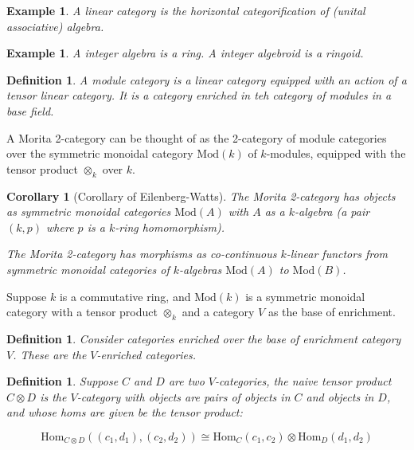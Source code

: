 \documentclass{tufte-book}
\newtheorem{definition}[theorem]{Definition}
\newtheorem{example}[theorem]{Example}
\newtheorem{corollary}[theorem]{Corollary}
\begin{document}
\begin{example}
	A linear category is the horizontal categorification of (unital associative) algebra.
\end{example}

\begin{example}
	A integer algebra is a ring. A integer algebroid is a ringoid.
\end{example}

\begin{definition}
	A module category is a linear category equipped with an action of a tensor linear category. It is a category enriched in teh category of modules in a base field.
\end{definition}

A Morita 2-category can be thought of as the 2-category of module categories over the symmetric monoidal category $\mathrm{Mod}(k)$ of $k$-modules, equipped with the tensor product $\otimes_k$ over $k$.

\begin{corollary}[Corollary of Eilenberg-Watts]
	The Morita 2-category has objects as symmetric monoidal categories $\mathrm{Mod}(A)$ with $A$ as a $k$-algebra (a pair $(k, p)$ where $p$ is a $k$-ring homomorphism).

	The Morita 2-category has morphisms as co-continuous $k$-linear functors from symmetric monoidal categories of $k$-algebras $\mathrm{Mod}(A)$ to $\mathrm{Mod}(B)$.
\end{corollary}

Suppose $k$ is a commutative ring, and $\mathrm{Mod}(k)$ is a symmetric monoidal category with a tensor product $\otimes_k$ and a category $V$ as the base of enrichment.

\begin{definition}
	Consider categories enriched over the base of enrichment category $V$. These are the $V$-enriched categories.
\end{definition}

\begin{definition}
	Suppose $C$ and $D$ are two $V$-categories, the naive tensor product $C \otimes D$ is the $V$-category with objects are pairs of objects in $C$ and objects in $D$, and whose homs are given be the tensor product:

\begin{equation}
	\mathrm{Hom}_{C \otimes D} ((c_1, d_1), (c_2, d_2)) \cong \mathrm{Hom}_{C}(c_1, c_2) \otimes \mathrm{Hom}_{D}(d_1, d_2)
\end{equation}

\end{definition}
\end{document}
